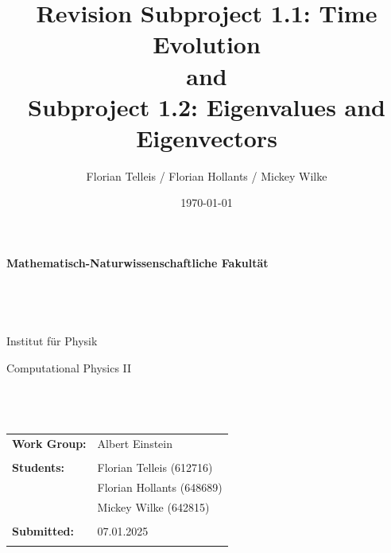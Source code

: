 \documentclass[11pt, letterpaper, onecolumn]{article}
\begin{document}
\setlength{\columnsep}{6mm} 

\title{Revision Subproject 1.1: Time Evolution\\
        and\\
        \vspace{2mm}
        Subproject 1.2: Eigenvalues and Eigenvectors} 
\author{Florian Telleis / Florian Hollants / Mickey Wilke}
\date{\today}

\pagestyle{fancy}
	\begin{titlepage}
		\thispagestyle{empty}
		\begin{figure}
			
		\end{figure}
		\vspace*{-43mm}\hspace{-6mm}\textbf{\textcolor{pantone294}{\large{Mathematisch-Naturwissenschaftliche Fakultät}}}\\\\\\\\\\
		\textcolor{pantone294}{Institut für Physik}\\
		\vspace{30mm}
		\begin{center}
			\textcolor{pantone294}{\huge{Computational Physics II}}\\\vspace*{7mm}
			\textcolor{pantone294}{\huge{\textbf{\thetitle}}}\\\vspace*{10mm}
			\textcolor{pantone294}{\theauthor}\\\vspace*{10mm}
			\textcolor{pantone294}{\thedate}\\\vspace*{20mm}
			\begin{tabular}{ll}
				\textbf{Work Group:} & Albert Einstein	 \\ \\
				\textbf{Students:} & Florian Telleis (612716) \\
									& Florian Hollants (648689)\\
									& Mickey  Wilke (642815)\\ \\
				\textbf{Submitted:} & 07.01.2025 \\ \\				
			\end{tabular}
		\end{center}
	\end{titlepage}
	\makeatother
	\restoregeometry
		
\end{document}
